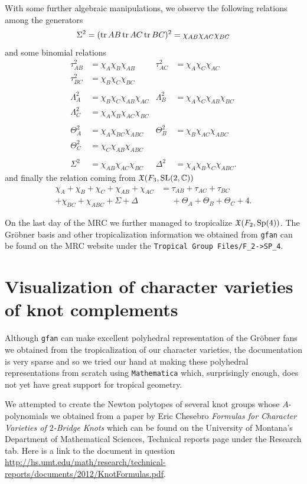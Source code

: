 \documentclass[11pt]{article}
\begin{document}
With some further algebraic manipulations, we observe the following
relations among the generators
\[
  \Sigma ^2=(\operatorname{tr} AB\operatorname{tr} AC\operatorname{tr} BC)^2=\chi_{AB}\chi_{AC}\chi_{BC}
\]
and some binomial relations
\begin{align*}
  \tau_{AB}^2&=\chi_A\chi_B\chi_{AB} &\tau_{AC}^2&=\chi_A\chi_C\chi_{AC}\\
  \tau_{BC}^2&=\chi_B\chi_C\chi_{BC}\\\\
  \Lambda_A^2&=\chi_B\chi_C\chi_{AB}\chi_{AC}
  &\Lambda_B^2&=\chi_A\chi_C\chi_{AB}\chi_{BC}\\
  \Lambda_C^2&=\chi_A\chi_B\chi_{AC}\chi_{BC}\\\\
  \Theta_A^2&=\chi_A\chi_{BC}\chi_{ABC}&\Theta_B^2&=\chi_B\chi_{AC}\chi_{ABC}\\
  \Theta_C^2&=\chi_C\chi_{AB}\chi_{ABC}\\\\
  \Sigma ^2&=\chi_{AB}\chi_{AC}\chi_{BC}&\Delta^2&=\chi_A\chi_B\chi_C\chi_{ABC}.
\end{align*}
and finally the relation coming from $\mathfrak{X}(F_3,\mathrm{SL}(2,\mathbb{C}))$
\begin{align*}
  \chi_A+\chi_B+\chi_C+\chi_{AB}+\chi_{AC}
  &=\tau_{AB}+\tau_{AC}+\tau_{BC}\\
  +\chi_{BC}+\chi_{ABC}+\Sigma+\Delta
  &\phantom{{}={}}+\Theta_A+\Theta_B+\Theta_C+4.
\end{align*}

On the last day of the MRC we further managed to tropicalize
$\mathfrak{X}(F_2,\mathrm{Sp}(4))$. The Gröbner basis and other tropicalization
information we obtained from \texttt{gfan} can be found on the MRC website
under the \texttt{Tropical Group Files/F\_2->SP\_4}.

\section{Visualization of character varieties of knot complements}
Although \texttt{gfan} can make excellent polyhedral representation of the
Gröbner fans we obtained from the tropicalization of our character
varieties, the documentation is very sparse and so we tried our hand at
making these polyhedral representations from scratch using
\texttt{Mathematica} which, surprisingly enough, does not yet have great
support for tropical geometry.

We attempted to create the Newton polytopes of several knot groups whose
$A$-polynomials we obtained from a paper by Eric Chesebro \emph{Formulas
  for Character Varieties of $2$-Bridge Knots} which can be found on the
University of Montana's Department of Mathematical Sciences, Technical
reports page under the Research tab. Here is a link to the document in
question
\url{http://hs.umt.edu/math/research/technical-reports/documents/2012/KnotFormulas.pdf}.
\end{document}
